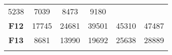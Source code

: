 \documentclass[12pt,a4paper]{article}
\begin{document}
\begin{longtable}[c]{@{}cccccc@{}}
\begin{minipage}[t]{0.08\columnwidth}
5238
\strut\end{minipage} &
\begin{minipage}[t]{0.09\columnwidth}\centering\strut
7039
\strut\end{minipage} &
\begin{minipage}[t]{0.10\columnwidth}\centering\strut
8473
\strut\end{minipage} &
\begin{minipage}[t]{0.10\columnwidth}\centering\strut
9180
\strut\end{minipage}\tabularnewline
\begin{minipage}[t]{0.12\columnwidth}\centering\strut
\textbf{F12}
\strut\end{minipage} &
\begin{minipage}[t]{0.08\columnwidth}\centering\strut
17745
\strut\end{minipage} &
\begin{minipage}[t]{0.08\columnwidth}\centering\strut
24681
\strut\end{minipage} &
\begin{minipage}[t]{0.09\columnwidth}\centering\strut
39501
\strut\end{minipage} &
\begin{minipage}[t]{0.10\columnwidth}\centering\strut
45310
\strut\end{minipage} &
\begin{minipage}[t]{0.10\columnwidth}\centering\strut
47487
\strut\end{minipage}\tabularnewline
\begin{minipage}[t]{0.12\columnwidth}\centering\strut
\textbf{F13}
\strut\end{minipage} &
\begin{minipage}[t]{0.08\columnwidth}\centering\strut
8681
\strut\end{minipage} &
\begin{minipage}[t]{0.08\columnwidth}\centering\strut
13990
\strut\end{minipage} &
\begin{minipage}[t]{0.09\columnwidth}\centering\strut
19692
\strut\end{minipage} &
\begin{minipage}[t]{0.10\columnwidth}\centering\strut
25638
\strut\end{minipage} &
\begin{minipage}[t]{0.10\columnwidth}\centering\strut
28889
\strut\end{minipage}\tabularnewline
\begin{minipage}[t]{0.12\columnwidth}\centering\strut

\end{minipage}
\end{longtable}
\end{document}
